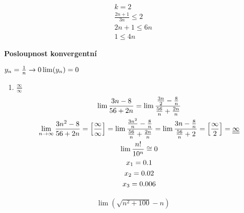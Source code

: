 \begin{gather*}
    k = 2
    \\ \frac{2n+1}{3n} \leq  2
    \\ 2n+1 \leq 6n
    \\ 1 \leq 4n
\end{gather*}

\textbf{Posloupnost konvergentní}
\begin{description}
    $ y_n = \frac{1}{n} \rightarrow 0 \\ \lim(y_n) = 0$
\end{description}

\begin{enumerate}
    \item $\frac{\infty}{\infty}$
    \begin{gather}
        \lim{\frac{3n-8}{56+2n}} = 
         \lim{\frac{\frac{3n}{2} - \frac{8}{n}}{\frac{56}{n}+\frac{2n}{n}}}
         \\
         \lim_{n\rightarrow\infty}{\frac{3n^2-8}{56+2n}} = \left[\frac{\infty}{\infty}\right] =
          \lim{\frac{\frac{3n^2}{n}-\frac{8}{n}}{\frac{56}{n}+\frac{2n}{n}}} =
          \lim{\frac{3n- \frac{8}{n}}{\frac{56}{n} + 2}} = \left[ \frac{\infty}{2}\right] = \underline{\underline{\infty}}
        \\
        \lim{\frac{n!}{10^n}} \cong 0
        \\x_1 = 0.1
        \\x_2 = 0.02
        \\x_3 = 0.006
    \end{gather}
\end{enumerate}
\begin{align}
    \lim{(\sqrt{n^2+100}-n)}
\end{align}
